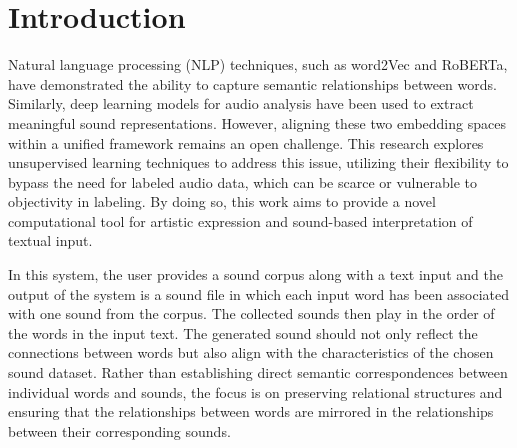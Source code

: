 \documentclass[twoside,a4paper]{article}
\title{\papertitle}
\newif\ifpdf
\begin{document}
\ifpdf %
  \DeclareGraphicsExtensions{.png,.jpg,.pdf}
\else  %
\fi


\maketitle

\begin{abstract}
This research focuses on developing a framework for unsupervised text-to-sound mapping by aligning two distinct embedding spaces: one for text and one for sound. The goal is to create a system that converts textual input into corresponding sound output without relying on labeled data. Designed as a creative tool for artistic exploration, this approach seeks to establish meaningful connections between words and sounds in an unsupervised manner. This paper presents the methodology, experiments, and results of this novel approach, along with its artistic implications. The system is evaluated using quantitative metrics such as pairwise distance, Wasserstein distance, and CLAP distance, as well as clustering metrics, to assess the quality of the mappings. The results demonstrate the potential of unsupervised methods for creative applications in text-to-sound mapping.
\end{abstract}

\section{Introduction}

Natural language processing (NLP) techniques, such as word2Vec and RoBERTa, have demonstrated the ability to capture semantic relationships between words. Similarly, deep learning models for audio analysis have been used to extract meaningful sound representations. However, aligning these two embedding spaces within a unified framework remains an open challenge. This research explores unsupervised learning techniques to address this issue, utilizing their flexibility to bypass the need for labeled audio data, which can be scarce or vulnerable to objectivity in labeling. By doing so, this work aims to provide a novel computational tool for artistic expression and sound-based interpretation of textual input.

In this system, the user provides a sound corpus along with a text input and the output of the system is a sound file in which each input word has been associated with one sound from the corpus. The collected sounds then play in the order of the words in the input text. The generated sound should not only reflect the connections between words but also align with the characteristics of the chosen sound dataset. Rather than establishing direct semantic correspondences between individual words and sounds, the focus is on preserving relational structures and ensuring that the relationships between words are mirrored in the relationships between their corresponding sounds. 
\end{document}

